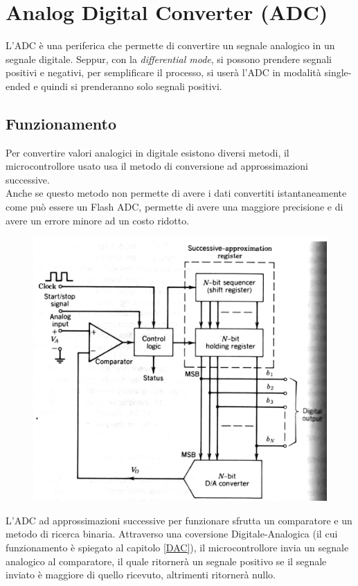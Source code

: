 
\section{Analog Digital Converter (ADC)}
L'ADC è una periferica che permette di convertire un segnale analogico in un segnale digitale. Seppur, con la \textit{differential mode}, si possono prendere segnali positivi e negativi, per semplificare il processo, si userà l'ADC in modalità single-ended e quindi si prenderanno solo segnali positivi.\\

\subsection{Funzionamento}
Per convertire valori analogici in digitale esistono diversi metodi, il microcontrollore usato usa il metodo di conversione ad approssimazioni successive.\\

Anche se questo metodo non permette di avere i dati convertiti istantaneamente come può essere un Flash ADC, permette di avere una maggiore precisione e di avere un errore minore ad un costo ridotto.\\

\begin{figure}
    \includegraphics[width=0.8\linewidth]{microcontrollore/assets/ADC.png}
    \label{fig:ADC}
\end{figure}

L'ADC ad approssimazioni successive per funzionare sfrutta un comparatore e un metodo di ricerca binaria. Attraverso una coversione Digitale-Analogica (il cui funzionamento è spiegato al capitolo {\hypersetup{linkcolor= black} \ref{DAC}}), il microcontrollore invia un segnale analogico al comparatore, il quale ritornerà un segnale positivo se il segnale inviato è maggiore di quello ricevuto, altrimenti ritornerà nullo.\\

